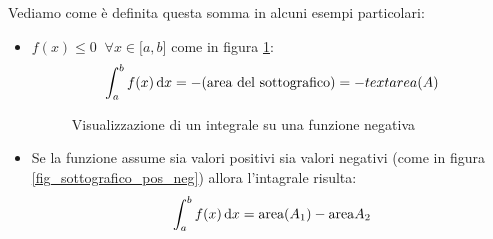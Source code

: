 Vediamo come è definita questa somma in alcuni esempi particolari:
\begin{itemize}
	\item $f(x) \leq 0 \;\; \forall x \in \mathbb[a, b]$ come in figura \ref{fig_sottografico_neg}:
		\begin{equation*}
			\int_a^b f(x) \,\text{d} x = - (\text{area del sottografico}) = -text{area}(A)
		\end{equation*}

		\begin{figure}[h]
			\begin{center}


			\end{center}
			\caption{Visualizzazione di un integrale su una funzione negativa}
			\label{fig_sottografico_neg}

		\end{figure}




	\item Se la funzione assume sia valori positivi sia valori negativi (come in figura \ref{fig_sottografico_pos_neg}) allora l'intagrale risulta:
		\begin{equation*}
			\int_a^b f(x) \,\text{d} x = \text{area}(A_1) - \text{area}{A_2}
		\end{equation*}


		\begin{figure}[h]
			\begin{center}


\end{center}
\end{figure}
\end{itemize}
